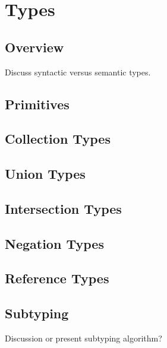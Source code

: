 \chapter{Types}
\section{Overview}
Discuss syntactic versus semantic types.
\section{Primitives}
\section{Collection Types}
\section{Union Types}
\section{Intersection Types}
\section{Negation Types}
\section{Reference Types}
\section{Subtyping}
Discussion or present subtyping algorithm?
